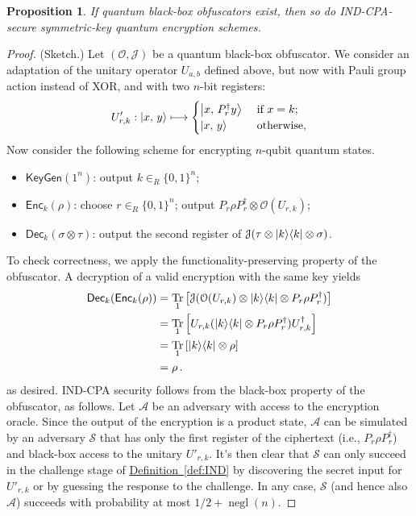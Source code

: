 \documentclass[11pt]{article}
\DeclareMathOperator{\tr}{Tr}
\numberwithin{equation}{section}
\newtheorem{prop}{Proposition}
\newcommand{\opn}{\operatorname}
\newcommand{\expref}[2]{\texorpdfstring{\hyperref[#2]{#1~\ref{#2}}}{#1~\ref{#2}}}
\newcommand{\algo}{\mathcal}
\newcommand{\negl}{\opn{negl}}
\newcommand{\KeyGen}{\ensuremath{\mathsf{KeyGen}}\xspace}
\newcommand{\Enc}{\ensuremath{\mathsf{Enc}}\xspace}
\newcommand{\Dec}{\ensuremath{\mathsf{Dec}}\xspace}
\newcommand{\inrand}{\in_R}
\begin{document}
{\begin{prop}\label{prop:PKE-from-SKE}
If quantum black-box obfuscators exist, then so do IND-CPA-secure symmetric-key quantum encryption schemes.
\end{prop}
\begin{proof} (Sketch.)
Let $(\algo O, \algo J)$ be a quantum black-box obfuscator. We consider an adaptation of the unitary operator $U_{a, b}$ defined above, but now with Pauli group action instead of XOR, and with two $n$-bit registers:
$$
U'_{r, k} : {\left\vert{x,\, y}\right\rangle} \longmapsto
\begin{cases}
{\left\vert{x,\, P_r^\dagger y}\right\rangle} &\text{ if } x = k;\\
{\left\vert{x,\, y}\right\rangle} &\text{ otherwise},
\end{cases}
$$
Now consider the following scheme for encrypting $n$-qubit quantum states.
\begin{itemize}
\item $\KeyGen(1^n)$: output $k \inrand \{0, 1\}^n$;
\item $\Enc_{k}(\rho)$: choose $r \inrand \{0, 1\}^n$; output $P_r \rho P_r^\dagger \otimes \algo O(U_{r, k})$;
\item $\Dec_{k}(\sigma \otimes \tau)$: output  the second register of $\algo J(\tau \otimes \ket{k}\bra{k} \otimes \sigma)$.
\end{itemize}
To check correctness, we apply the functionality-preserving property of the obfuscator. A decryption of a valid encryption with the same key yields
\begin{align*}
\Dec_k (\Enc_k (\rho))  
&= \tr_1 \left[\algo J(\algo O(U_{r, k}) \otimes \ket{k}\bra{k} \otimes P_r \rho P_r^\dagger)\right] \\
&= \tr_1 \left[U_{r, k} (\ket{k}\bra{k} \otimes P_r \rho P_r^\dagger) U_{r, k}^\dagger\right] \\
&= \tr_1 \left[\ket{k}\bra{k} \otimes \rho \right] \\
& = \rho\,.
\end{align*}
as desired. IND-CPA security follows from the black-box property of the obfuscator, as follows. Let $\algo A$ be an adversary with access to the encryption oracle. Since the output of the encryption is a product state, $\algo A$ can be simulated by an adversary $\algo S$ that has only the first register of the ciphertext (i.e., $P_r \rho P_r^\dagger$) and black-box access to the unitary $U'_{r, k}$. It's then clear that $\algo S$ can only succeed in the challenge stage of \expref{Definition}{def:IND} by discovering the secret input for $U'_{r, k}$ or by guessing the response to the challenge. In any case, $\algo S$ (and hence also $\algo A$) succeeds with probability at most $1/2 + \negl(n)$.
\end{proof}

}
\end{document}
